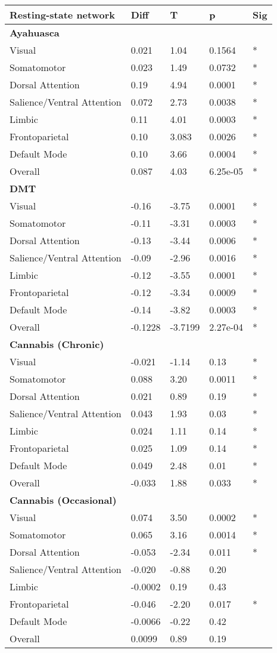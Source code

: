 \begin{longtable}[]{@{}lllll@{}}
\toprule\noalign{}
Resting-state network & Diff & T & p & Sig \\
\midrule\noalign{}
\endhead
\bottomrule\noalign{}
\endlastfoot
\textbf{Ayahuasca} & & & & \\
Visual & 0.021 & 1.04 & 0.1564 & * \\
Somatomotor & 0.023 & 1.49 & 0.0732 & * \\
Dorsal Attention & 0.19 & 4.94 & 0.0001 & * \\
Salience/Ventral Attention & 0.072 & 2.73 & 0.0038 & * \\
Limbic & 0.11 & 4.01 & 0.0003 & * \\
Frontoparietal & 0.10 & 3.083 & 0.0026 & * \\
Default Mode & 0.10 & 3.66 & 0.0004 & * \\
Overall & 0.087 & 4.03 & 6.25e-05 & * \\
\textbf{DMT} & & & & \\
Visual & -0.16 & -3.75 & 0.0001 & * \\
Somatomotor & -0.11 & -3.31 & 0.0003 & * \\
Dorsal Attention & -0.13 & -3.44 & 0.0006 & * \\
Salience/Ventral Attention & -0.09 & -2.96 & 0.0016 & * \\
Limbic & -0.12 & -3.55 & 0.0001 & * \\
Frontoparietal & -0.12 & -3.34 & 0.0009 & * \\
Default Mode & -0.14 & -3.82 & 0.0003 & * \\
Overall & -0.1228 & -3.7199 & 2.27e-04 & * \\
\textbf{Cannabis (Chronic)} & & & & \\
Visual & -0.021 & -1.14 & 0.13 & * \\
Somatomotor & 0.088 & 3.20 & 0.0011 & * \\
Dorsal Attention & 0.021 & 0.89 & 0.19 & * \\
Salience/Ventral Attention & 0.043 & 1.93 & 0.03 & * \\
Limbic & 0.024 & 1.11 & 0.14 & * \\
Frontoparietal & 0.025 & 1.09 & 0.14 & * \\
Default Mode & 0.049 & 2.48 & 0.01 & * \\
Overall & -0.033 & 1.88 & 0.033 & * \\
\textbf{Cannabis (Occasional)} & & & & \\
Visual & 0.074 & 3.50 & 0.0002 & * \\
Somatomotor & 0.065 & 3.16 & 0.0014 & * \\
Dorsal Attention & -0.053 & -2.34 & 0.011 & * \\
Salience/Ventral Attention & -0.020 & -0.88 & 0.20 & \\
Limbic & -0.0002 & 0.19 & 0.43 & \\
Frontoparietal & -0.046 & -2.20 & 0.017 & * \\
Default Mode & -0.0066 & -0.22 & 0.42 & \\
Overall & 0.0099 & 0.89 & 0.19 & \\
\end{longtable}

